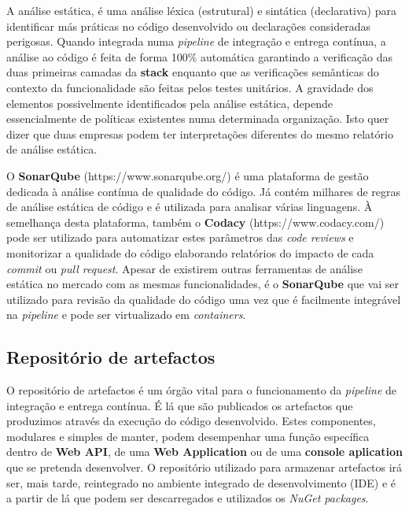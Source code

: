 \hspace{1cm}A análise estática, é uma análise léxica (estrutural) e sintática (declarativa) para identificar más práticas no código desenvolvido ou declarações consideradas perigosas. Quando integrada numa \textit{pipeline} de integração e entrega contínua, a análise ao código é feita de forma 100\% automática garantindo a verificação das duas primeiras camadas da \textbf{stack} enquanto que as verificações semânticas do contexto da funcionalidade são feitas pelos testes unitários. A gravidade dos elementos possivelmente identificados pela análise estática, depende essencialmente de políticas existentes numa determinada organização. Isto quer dizer que duas empresas podem ter interpretações diferentes do mesmo relatório de análise estática.

\hspace{1cm}O \textbf{SonarQube} (https://www.sonarqube.org/) é uma plataforma de gestão dedicada à análise contínua de qualidade do código. Já contém milhares de regras de análise estática de código e é utilizada para analisar várias linguagens. À semelhança desta plataforma, também o \textbf{Codacy} (https://www.codacy.com/) pode ser utilizado para automatizar estes parâmetros das \textit{code reviews} e monitorizar a qualidade do código elaborando relatórios do impacto de cada \textit{commit} ou \textit{pull request}. Apesar de existirem outras ferramentas de análise estática no mercado com as mesmas funcionalidades, é o \textbf{SonarQube} que vai ser utilizado para revisão da qualidade do código uma vez que é facilmente integrável na \textit{pipeline} e pode ser virtualizado em \textit{containers}. 

\subsection{Repositório de artefactos}

\hspace{1cm}O repositório de artefactos é um órgão vital para o funcionamento da \textit{pipeline} de integração e entrega contínua. É lá que são publicados os artefactos que produzimos através da execução do código desenvolvido. Estes componentes, modulares e simples de manter, podem desempenhar uma função específica dentro de \textbf{Web API}, de uma \textbf{Web Application} ou de uma \textbf{console aplication} que se pretenda desenvolver. O repositório utilizado para armazenar artefactos irá ser, mais tarde, reintegrado no ambiente integrado de desenvolvimento (IDE) e é a partir de lá que podem ser descarregados e utilizados os \textit{NuGet packages}.

